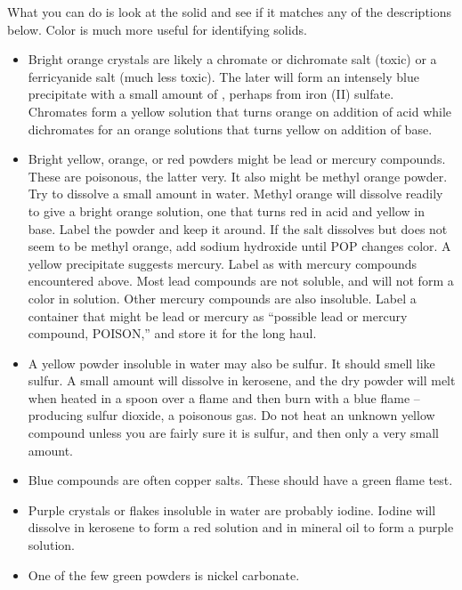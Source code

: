 What you can do is look at the solid 
and see if it matches any of the descriptions below.
Color is much more useful for identifying solids.

\begin{itemize}

\item{Bright orange crystals are likely a chromate 
or dichromate salt (toxic) or a ferricyanide salt (much less toxic). 
The later will form an intensely blue precipitate 
with a small amount of , 
perhaps from iron (II) sulfate. 
Chromates form a yellow solution that turns orange 
on addition of acid while dichromates for an orange solutions 
that turns yellow on addition of base.}

\item{Bright yellow, 
orange, 
or red powders might be lead or mercury compounds. 
These are poisonous, 
the latter very. 
It also might be methyl orange powder. 
Try to dissolve a small amount in water. 
Methyl orange will dissolve readily to give a bright orange solution, 
one that turns red in acid and yellow in base. 
Label the powder and keep it around. 
If the salt dissolves but does not seem to be methyl orange, 
add sodium hydroxide until POP changes color. 
A yellow precipitate suggests mercury. 
Label as with mercury compounds encountered above. 
Most lead compounds are not soluble, 
and will not form a color in solution. 
Other mercury compounds are also insoluble. 
Label a container that might be lead or mercury as 
``possible lead or mercury compound, 
POISON,'' and store it for the long haul.}

\item{A yellow powder insoluble in water may also be sulfur. 
It should smell like sulfur. 
A small amount will dissolve in kerosene, 
and the dry powder will melt when heated in a spoon 
over a flame and then burn with a blue flame -- 
producing sulfur dioxide, 
a poisonous gas. 
Do not heat an unknown yellow compound 
unless you are fairly sure it is sulfur, 
and then only a very small amount.}

\item{Blue compounds are often copper salts. 
These should have a green flame test.}

\item{Purple crystals or flakes insoluble in water are probably iodine. 
Iodine will dissolve in kerosene to form a red solution 
and in mineral oil to form a purple solution.}

\item{One of the few green powders is nickel carbonate.}


\end{itemize}
